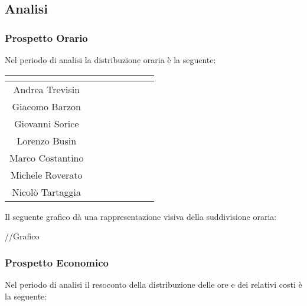 \subsection{Analisi}

\subsubsection{Prospetto Orario}
Nel periodo di analisi la distribuzione oraria è la seguente:

\begin{center}
\renewcommand{\arraystretch}{1.5}
\begin{tabular}{|c|c|c|c|c|c|c|c|}
\hline
\rowcolor{title_row}
\textbf{\color{title_text}{Nome}} & \textbf{\color{title_text}{Resp.}} & \textbf{\color{title_text}{Ammi.}} & \textbf{\color{title_text}{Analist.}} & \textbf{\color{title_text}{Progett.}} & \textbf{\color{title_text}{Program.}} & \textbf{\color{title_text}{Verific.}} & \textbf{\color{title_text}{Totale}} \\ \hline
Andrea Trevisin  & & & & & & &  \\ \hline
Giacomo Barzon   & & & & & & &  \\ \hline
Giovanni Sorice  & & & & & & &  \\ \hline
Lorenzo Busin    & & & & & & &  \\ \hline
Marco Costantino & & & & & & &  \\ \hline
Michele Roverato & & & & & & &  \\ \hline
Nicolò Tartaggia & & & & & & &  \\ \hline
\end{tabular}
\renewcommand{\arraystretch}{1}
\end{center}

Il seguente grafico dà una rappresentazione visiva della suddivisione oraria: \\
\begin{center}
//Grafico
\end{center}


\subsubsection{Prospetto Economico}
Nel periodo di analisi il resoconto della distribuzione delle ore e dei relativi costi è la seguente:


